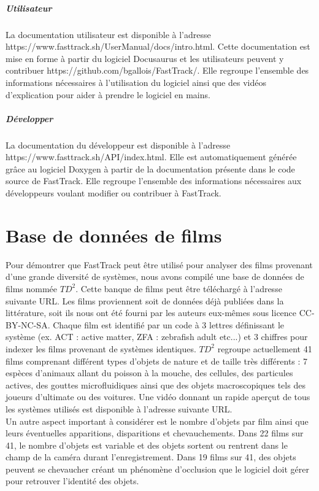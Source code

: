 		\paragraph{Utilisateur} La documentation utilisateur est disponible à l'adresse https://www.fasttrack.sh/UserManual/docs/intro.html. Cette documentation est mise en forme à partir du logiciel Docusaurus et les utilisateurs peuvent y contribuer https://github.com/bgallois/FastTrack/. Elle regroupe l'ensemble des informations nécessaires à l'utilisation du logiciel ainsi que des vidéos d'explication pour aider à prendre le logiciel en mains.
		
		\paragraph{Développer} La documentation du développeur est disponible à l'adresse https://www.fasttrack.sh/API/index.html. Elle est automatiquement générée grâce au logiciel Doxygen à partir de la documentation présente dans le code source de FastTrack. Elle regroupe l'ensemble des informations nécessaires aux développeurs voulant modifier ou contribuer à FastTrack.

		
\chapter{Base de données de films}
    
    Pour démontrer que FastTrack peut être utilisé pour analyser des films provenant d'une grande diversité de systèmes, nous avons compilé une base de données de films nommée $TD^2$. Cette banque de films peut être téléchargé à l'adresse suivante URL. Les films proviennent soit de données déjà publiées dans la littérature, soit ils nous ont été fourni par les auteurs eux-mêmes sous licence CC-BY-NC-SA. Chaque film est identifié par un code à 3 lettres définissant le système (ex. ACT : active matter, ZFA : zebrafish adult etc...) et 3 chiffres pour indexer les films provenant de systèmes identiques. $TD^2$ regroupe actuellement 41 films comprenant différent types d'objets de nature et de taille très différents : 7 espèces d'animaux allant du poisson à la mouche, des cellules, des particules actives, des gouttes microfluidiques ainsi que des objets macroscopiques tels des joueurs d'ultimate ou des voitures. Une vidéo donnant un rapide aperçut de tous les systèmes utilisés est disponible à l'adresse suivante URL.\\

    Un autre aspect important à considérer est le nombre d'objets par film ainsi que leurs éventuelles apparitions, disparitions et chevauchements. Dans 22 films sur 41, le nombre d'objets est variable et des objets sortent ou rentrent dans le champ de la caméra durant l'enregistrement. Dans 19 films sur 41, des objets peuvent se chevaucher créant un phénomène d'occlusion que le logiciel doit gérer pour retrouver l'identité des objets.


